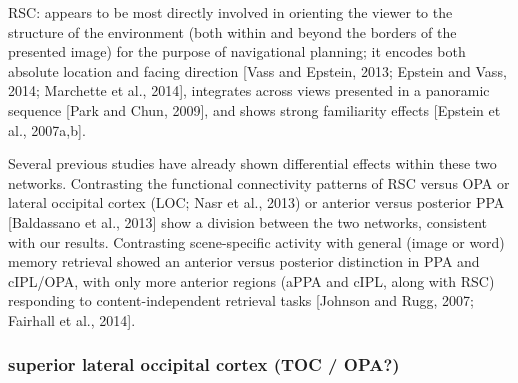 \documentclass[english]{article}
\begin{document}
RSC: appears to be most directly involved in orienting the viewer to the
structure of the environment (both within and beyond the borders of the
presented image) for the purpose of navigational planning; it encodes both
absolute location and facing direction [Vass and Epstein, 2013; Epstein and
Vass, 2014; Marchette et al., 2014], integrates across views presented in a
panoramic sequence [Park and Chun, 2009], and shows strong familiarity effects
[Epstein et al., 2007a,b]\citep{baldassano2016two}.

Several previous studies have already shown differential effects within these
two networks. Contrasting the functional connectivity patterns of RSC versus OPA
or lateral occipital cortex (LOC; Nasr et al., 2013) or anterior versus
posterior PPA [Baldassano et al., 2013] show a division between the two
networks, consistent with our results. Contrasting scene-specific activity with
general (image or word) memory retrieval showed an anterior versus posterior
distinction in PPA and cIPL/OPA, with only more anterior regions (aPPA and cIPL,
along with RSC) responding to content-independent retrieval tasks [Johnson and
Rugg, 2007; Fairhall et al., 2014]\citep{baldassano2016two}.


\subsubsection{superior lateral occipital cortex (TOC / OPA?)}



\end{document}
